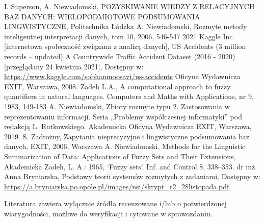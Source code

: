 \documentclass{classrep}
\begin{document}
\begin{thebibliography}{99}
 I. Superson, A. Niewiadomski, POZYSKIWANIE WIEDZY Z RELACYJNYCH BAZ DANYCH: WIELOPODMIOTOWE PODSUMOWANIA LINGWISTYCZNE, Politechnika Łódzka
 A. Niewiadomski, Rozmyte metody inteligentnej interpretacji danych, tom 10, 2006, 546-547
 2021 Kaggle Inc [internetowa społeczność związana z analizą danych], US Accidents (3 million records -- updated)
A Countrywide Traffic Accident Dataset (2016 - 2020) [przeglądany 24 kwietnia 2021], Dostępny w: \url{https://www.kaggle.com/sobhanmoosavi/us-accidents}
Oficyna Wydawnicza EXIT, Warszawa, 2008.
 Zadeh L.A., A computational approach to fuzzy quantifiers in natural languages. Computers and Maths with Applications, nr 9, 1983, 149-183
  A. Niewiadomski, Zbiory rozmyte typu 2. Zastosowania w reprezentowaniu informacji.  Seria „Problemy współczesnej informatyki” pod redakcją L. Rutkowskiego. Akademicka Oficyna Wydawnicza EXIT, Warszawa, 2019.
 S. Zadrożny, Zapytania nieprecyzyjne i lingwistyczne podsumowania baz danych, EXIT, 2006, Warszawa
 A. Niewiadomski, Methods for the Linguistic Summarization of Data: Applications of Fuzzy Sets and Their Extensions, Akademicka 
 Zadeh, L. A.: 1965, ‘Fuzzy sets’. Inf. and Control 8, 338–353.
 dr inż. Anna Bryniarska, Podstawy teorii systemów rozmytych z zadaniami, Dostępny w: \url{https://a.bryniarska.po.opole.pl/images/nsi/skrypt_r2_28listopada.pdf},
\end{thebibliography}

Literatura zawiera wyłącznie źródła recenzowane i/lub o potwierdzonej wiarygodności,
możliwe do weryfikacji i cytowane w sprawozdaniu. 
\end{document}
